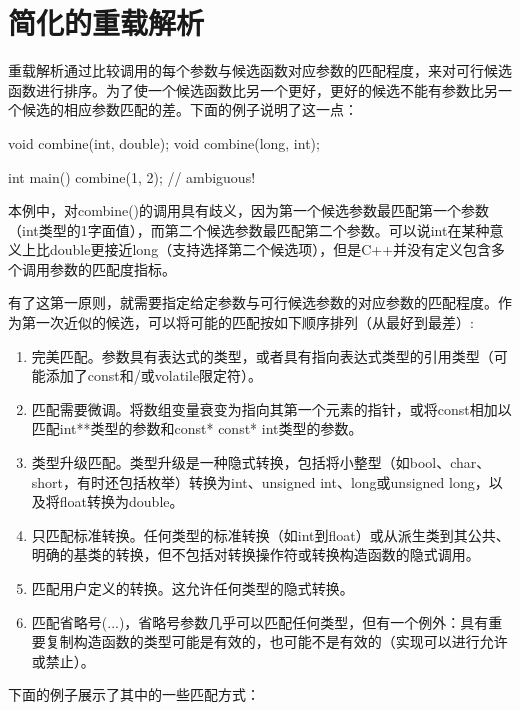 \section{简化的重载解析}

重载解析通过比较调用的每个参数与候选函数对应参数的匹配程度，来对可行候选函数进行排序。为了使一个候选函数比另一个更好，更好的候选不能有参数比另一个候选的相应参数匹配的差。下面的例子说明了这一点：

\begin{cpp}
void combine(int, double);
void combine(long, int);

int main()
{
	combine(1, 2); // ambiguous!
}
\end{cpp}

本例中，对combine()的调用具有歧义，因为第一个候选参数最匹配第一个参数（int类型的1字面值），而第二个候选参数最匹配第二个参数。可以说int在某种意义上比double更接近long（支持选择第二个候选项），但是C++并没有定义包含多个调用参数的匹配度指标。

有了这第一原则，就需要指定给定参数与可行候选参数的对应参数的匹配程度。作为第一次近似的候选，可以将可能的匹配按如下顺序排列（从最好到最差）:

\begin{enumerate}
\item 
完美匹配。参数具有表达式的类型，或者具有指向表达式类型的引用类型（可能添加了const和/或volatile限定符）。

\item 
匹配需要微调。将数组变量衰变为指向其第一个元素的指针，或将const相加以匹配int**类型的参数和const* const* int类型的参数。


\item 
类型升级匹配。类型升级是一种隐式转换，包括将小整型（如bool、char、short，有时还包括枚举）转换为int、unsigned int、long或unsigned long，以及将float转换为double。


\item 
只匹配标准转换。任何类型的标准转换（如int到float）或从派生类到其公共、明确的基类的转换，但不包括对转换操作符或转换构造函数的隐式调用。


\item 
匹配用户定义的转换。这允许任何类型的隐式转换。


\item 
匹配省略号(...)，省略号参数几乎可以匹配任何类型，但有一个例外：具有重要复制构造函数的类型可能是有效的，也可能不是有效的（实现可以进行允许或禁止）。
\end{enumerate}

下面的例子展示了其中的一些匹配方式：


